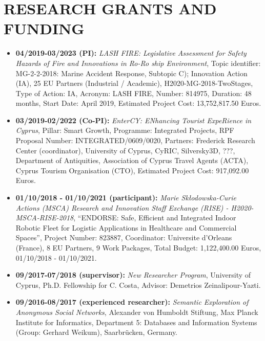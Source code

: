 \documentclass[10pt]{article}
\begin{document}
\newpage
\renewcommand{\labelitemi}{$\bullet$}

\section{\bf RESEARCH GRANTS AND FUNDING}
\begin{itemize}
\setlength{\itemsep}{0.10ex}


\item  {\bf 04/2019-03/2023 (PI):} {\em LASH FIRE: Legislative Assessment for Safety Hazards of Fire and Innovations in Ro-Ro ship Environment}, Topic identifier: MG-2-2-2018: Marine Accident Response, Subtopic C); Innovation Action (IA), 25 EU Partners (Industrial / Academic), H2020-MG-2018-TwoStages, Type of Action: IA, Acronym: LASH FIRE, Number: 814975, Duration: 48 months, Start Date: April 2019, Estimated Project Cost: 13,752,817.50 Euros.

\item  {\bf 03/2019-02/2022 (Co-PI):} {\em EnterCY: ENhancing Tourist ExpeRience in Cyprus}, Pillar:  Smart Growth, Programme: Integrated Projects, RPF Proposal Number: INTEGRATED/0609/0020,  Partners: Frederick Research Center (coordinator), University of Cyprus, CyRIC, Silversky3D, ???,  Department of Antiquities, Association of Cyprus Travel Agents (ACTA), Cyprus Tourism Organisation (CTO), Estimated Project Cost: 917,092.00 Euros.

\item {\bf 01/10/2018 - 01/10/2021 (participant):} {\em Marie Skłodowska-Curie Actions (MSCA) Research and Innovation Staff Exchange (RISE) - H2020-MSCA-RISE-2018}, ``ENDORSE: Safe, Efficient and Integrated Indoor Robotic Fleet for Logistic Applications in Healthcare and Commercial Spaces'', Project Number: 823887, Coordinator: Universite d'Orleans (France), 8 EU Partners, 9 Work Packages, Total Budget: 1,122,400.00 Euros, 01/10/2018 - 01/10/2021.

\item  {\bf 09/2017-07/2018 (supervisor):} {\em New Researcher Program}, University of Cyprus, Ph.D. Fellowship for C. Costa, Advisor: Demetrios Zeinalipour-Yazti.

\item {\bf 09/2016-08/2017 (experienced researcher):} {\em Semantic Exploration of Anonymous Social Networks}, Alexander von Humboldt Stiftung, Max Planck Institute for Informatics, Department 5: Databases and Information Systems (Group: Gerhard Weikum), Saarbr\"ucken, Germany.


\end{itemize}
\end{document}
